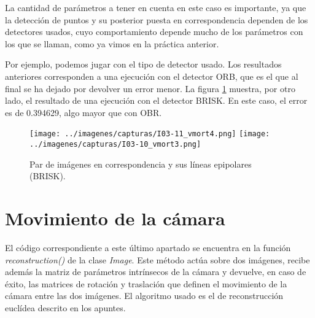 \documentclass[a4paper, 11pt]{article}
\theoremstyle{definition}
\theoremstyle{theorem}
\begin{document}
    La cantidad de parámetros a tener en cuenta en este caso es importante, ya que la detección de puntos y su posterior puesta en correspondencia dependen de los detectores usados, cuyo comportamiento depende mucho de los parámetros con los que se llaman, como ya vimos en la práctica anterior.

    Por ejemplo, podemos jugar con el tipo de detector usado. Los resultados anteriores corresponden a una ejecución con el detector ORB, que es el que al final se ha dejado por devolver un error menor. La figura \ref{fig:vmort_BRISK} muestra, por otro lado, el resultado de una ejecución con el detector BRISK. En este caso, el error es de 0.394629, algo mayor que con OBR.

    \begin{figure}[!htb]
        \texttt{[image: ../imagenes/capturas/I03-11\_vmort4.png]}
        \endminipage\hfill
        \texttt{[image: ../imagenes/capturas/I03-10\_vmort3.png]}
        \endminipage
        \caption{Par de imágenes en correspondencia y sus líneas epipolares (BRISK).}\label{fig:vmort_BRISK}
    \end{figure}

    \section{Movimiento de la cámara}
    El código correspondiente a este último apartado se encuentra en la función \emph{reconstruction()} de la clase \emph{Image}. Este método actúa sobre dos imágenes, recibe además la matriz de parámetros intrínsecos de la cámara y devuelve, en caso de éxito, las matrices de rotación y traslación que definen el movimiento de la cámara entre las dos imágenes. El algoritmo usado es el de reconstrucción euclídea descrito en los apuntes.
\end{document}
